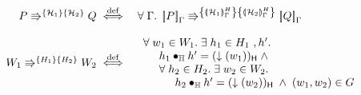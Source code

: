 \begin{definition}[Agreement]
\[\begin{array}{l}
\begin{array}{l}
	\end{array}
	
%
%	
%	
	
\end{array}
\]
%
\end{definition}
%
%
\begin{definition}[Repartitioning]
%
\[
\begin{array}{r l}
	\repartitions{P}{Q}{\heapAss{1}}{\heapAss{2}} \iffdef 
	& \for{\lenv} \repartitions{\sem[\lenv]{P}}{\sem[\lenv]{Q}}{\semH[\lenv]{\heapAss{1}}}{\semH[\lenv]{\heapAss{2}}}\\\\
	
	\repartitions{W_1}{W_2}{H_{1}}{H_{2}} \iffdef &
	\begin{array}{l}
		\for{w_1 \in W_1} \exsts{h_1 \in H_1\ , h'}\\
		\hspace*{0.5cm} h_1 \composeH h' = \heapPart{(\collapseW{w_1})} \;\land\\
		\hspace*{0.5cm} \for{h_2 \in H_2} \exsts{w_2 \in W_2}\\
		\hspace*{1cm} h_2 \composeH h' = \heapPart{(\collapseW{w_2})} \;\land\; (w_1, w_2) \in \guarantee
	\end{array}
\end{array}
\]
%
\end{definition}
